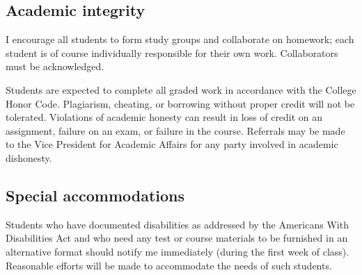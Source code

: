 \documentclass[symmetric]{tufte-handout}
\begin{document}
\subsection{Academic integrity}

I encourage all students to form study groups and collaborate on homework;
each student is of course individually responsible for their own work.
Collaborators must be acknowledged. 

Students are expected to complete all graded work in accordance with the
College Honor Code. Plagiarism, cheating, or borrowing without proper credit
will not be tolerated.  Violations of academic honesty can result in loss of
credit on an assignment, failure on an exam, or failure in the course.
Referrals may be made to the Vice President for Academic Affairs for any party
involved in academic dishonesty.

\subsection{Special accommodations}

Students who have documented disabilities as addressed by the Americans With
Disabilities Act and who need any test or course materials to be furnished in
an alternative format should notify me immediately (during the first week of
class).  Reasonable efforts will be made to accommodate the needs of such
students.


\begin{fullwidth}
\end{fullwidth}

\end{document}
